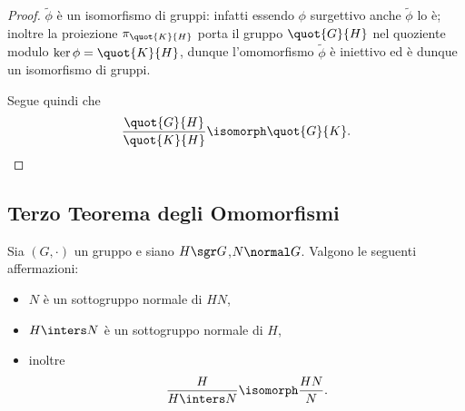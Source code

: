 \begin{proof}
    $\widetilde{\phi}$ è un isomorfismo di gruppi: infatti essendo $\phi$ surgettivo anche $\widetilde{\phi}$ lo è; inoltre la proiezione $\pi_{\quot{K}{H}}$ porta il gruppo $\quot{G}{H}$ nel quoziente modulo $\ker \phi = \quot{K}{H}$, dunque l'omomorfismo $\widetilde{\phi}$ è iniettivo ed è dunque un isomorfismo di gruppi.

    Segue quindi che \[
        \frac{\quot{G}{H}}{\quot{K}{H}} \isomorph \quot{G}{K}. \qedhere 
    \]
\end{proof}

\subsection{Terzo Teorema degli Omomorfismi}
\begin{theorem}
     Sia $(G, \cdot)$ un gruppo e siano $H \sgr G$,$N \normal G$. 
    Valgono le seguenti affermazioni: \begin{itemize}
        \item $N$ è un sottogruppo normale di $HN$,
        \item $H \inters N$ è un sottogruppo normale di $H$,
        \item inoltre \begin{equation}
            \frac{H}{H \inters N} \isomorph \frac{HN}{N}.
        \end{equation}
    \end{itemize}
\end{theorem}

